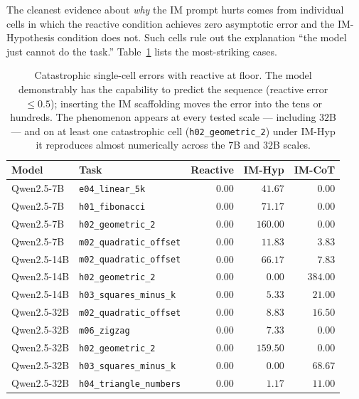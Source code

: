 \documentclass[11pt]{article}
\begin{document}
The cleanest evidence about \emph{why} the IM prompt hurts comes
from individual cells in which the reactive condition achieves
zero asymptotic error and the IM-Hypothesis condition does not.
Such cells rule out the explanation ``the model just cannot do
the task.''  Table~\ref{tab:catas} lists the most-striking cases.

\begin{table}[t]
\centering
\caption{Catastrophic single-cell errors with reactive at floor.
The model demonstrably has the capability to predict the sequence
(reactive error $\leq 0.5$); inserting the IM scaffolding moves the
error into the tens or hundreds.  The phenomenon appears at every
tested scale --- including $32$B --- and on at least one
catastrophic cell (\texttt{h02\_geometric\_2}) under IM-Hyp it
reproduces almost numerically across the $7$B and $32$B scales.}
\label{tab:catas}
\small
\begin{tabular}{ll rrr}
\toprule
Model & Task & Reactive & IM-Hyp & IM-CoT \\
\midrule
Qwen2.5-7B  & \texttt{e04\_linear\_5k}        & $0.00$ & $41.67$  & $0.00$  \\
Qwen2.5-7B  & \texttt{h01\_fibonacci}         & $0.00$ & $71.17$  & $0.00$  \\
Qwen2.5-7B  & \texttt{h02\_geometric\_2}      & $0.00$ & $160.00$ & $0.00$  \\
Qwen2.5-7B  & \texttt{m02\_quadratic\_offset} & $0.00$ & $11.83$  & $3.83$  \\
Qwen2.5-14B & \texttt{m02\_quadratic\_offset} & $0.00$ & $66.17$  & $7.83$  \\
Qwen2.5-14B & \texttt{h02\_geometric\_2}      & $0.00$ & $0.00$   & $384.00$ \\
Qwen2.5-14B & \texttt{h03\_squares\_minus\_k} & $0.00$ & $5.33$   & $21.00$ \\
Qwen2.5-32B & \texttt{m02\_quadratic\_offset} & $0.00$ & $8.83$   & $16.50$ \\
Qwen2.5-32B & \texttt{m06\_zigzag}            & $0.00$ & $7.33$   & $0.00$  \\
Qwen2.5-32B & \texttt{h02\_geometric\_2}      & $0.00$ & $159.50$ & $0.00$  \\
Qwen2.5-32B & \texttt{h03\_squares\_minus\_k} & $0.00$ & $0.00$   & $68.67$ \\
Qwen2.5-32B & \texttt{h04\_triangle\_numbers} & $0.00$ & $1.17$   & $11.00$ \\
\bottomrule
\end{tabular}
\end{table}
\end{document}
